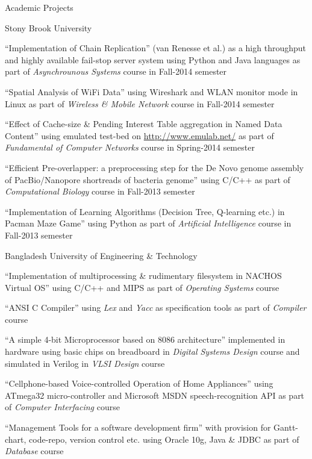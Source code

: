 \documentclass{resume} %
\begin{document}
\begin{rSection}{Academic Projects}
\begin{rSubsection}{Stony Brook University}{}{}{}
\item ``{Implementation of Chain Replication}'' (van Renesse et al.) as a
high throughput and highly available fail-stop server system using Python and Java
languages as part of \textit{Asynchrounous Systems} course in Fall-2014 semester
\item ``{Spatial Analysis of WiFi Data}'' using Wireshark and WLAN monitor
mode in Linux as part of \textit{Wireless \& Mobile Network} course in Fall-2014
semester 
\item ``{Effect of Cache-size \& Pending Interest Table
aggregation in Named Data Content}'' using emulated test-bed on 
\href{http://www.emulab.net/}{http://www.emulab.net/} as part of
\textit{Fundamental of Computer Networks} course in Spring-2014 semester
\item ``{Efficient Pre-overlapper: a preprocessing step for the De Novo
genome assembly of PacBio/Nanopore shortreads of bacteria genome}'' using C/C++ as
part of \textit{Computational Biology} course in Fall-2013 semester
\item ``{Implementation of Learning Algorithms (Decision Tree, Q-learning
etc.) in Pacman Maze Game}'' using Python as part of \textit{Artificial
Intelligence} course in Fall-2013 semester
\end{rSubsection}  
\begin{rSubsection}{Bangladesh University of Engineering \& Technology}{}{}{}
\item ``{Implementation of multiprocessing \& rudimentary filesystem in
NACHOS Virtual OS}'' using C/C++ and MIPS as part of \textit{Operating Systems}
course
\item ``{ANSI C Compiler}'' using \textit{Lex} and
\textit{Yacc} as  specification tools as part of \textit{Compiler} course
\item ``{A simple 4-bit Microprocessor based on 8086 architecture}''
implemented in hardware using basic chips on breadboard in
\textit{Digital Systems Design} course and simulated in Verilog in \textit{VLSI
Design} course
\item ``{Cellphone-based Voice-controlled Operation of Home Appliances}''
using ATmega32 micro-controller and Microsoft MSDN speech-recognition API as
part of \textit{Computer Interfacing} course
\item ``{Management Tools for a software development firm}'' with provision
for Gantt-chart, code-repo, version control etc. using Oracle 10g, Java \& JDBC
as part of \textit{Database} course
\end{rSubsection}
\end{rSection}
\end{document}
